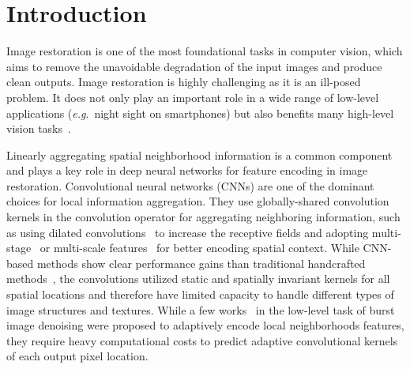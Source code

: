 \documentclass[default,iicol]{sn-jnl}
\theoremstyle{thmstyleone}\newtheorem{theorem}{Theorem}\newtheorem{proposition}[theorem]{Proposition}
\theoremstyle{thmstyletwo}\newtheorem{example}{Example}\newtheorem{remark}{Remark}
\theoremstyle{thmstylethree}\newtheorem{definition}{Definition}
\def\onedot{.~}
\def\eg{\emph{e.g}\onedot} \def\Eg{\emph{E.g}\onedot}
\begin{document}





\maketitle

\section{Introduction}
\label{sec:intro}
Image restoration is one of the most foundational tasks in computer vision, which aims to remove the unavoidable degradation of the input images and produce clean outputs. Image restoration is highly challenging as it is an ill-posed problem. It does not only play an important role in a wide range of low-level applications (\eg night sight on smartphones) but also benefits many high-level vision tasks~\cite{LiuWLWH18}.

Linearly aggregating spatial neighborhood information is a common component and plays a key role in deep neural networks for feature encoding in image restoration.
Convolutional neural networks (CNNs) are one of the dominant choices for local information aggregation. 
They use globally-shared convolution kernels in the convolution operator for aggregating neighboring information, such as using dilated convolutions~\cite{RIDNet, chang2020sadnet} to increase the receptive fields and adopting multi-stage~\cite{Zamir2021MPRNet} or multi-scale features~\cite{gu2019self,zamir2020mirnet} for better encoding spatial context.
While CNN-based methods show clear performance gains than traditional handcrafted methods~\cite{BM3D,NLM,wavelet,oldksvd}, 
the convolutions utilized static and spatially invariant kernels for all spatial locations and therefore have limited capacity to handle different types of image structures and textures.
While a few works~\cite{kpn,xia2020bpn,mckpn} in the low-level task of burst image denoising were proposed to adaptively encode local neighborhoods features,
they require heavy computational costs to predict adaptive convolutional kernels of each output pixel location.
\end{document}
